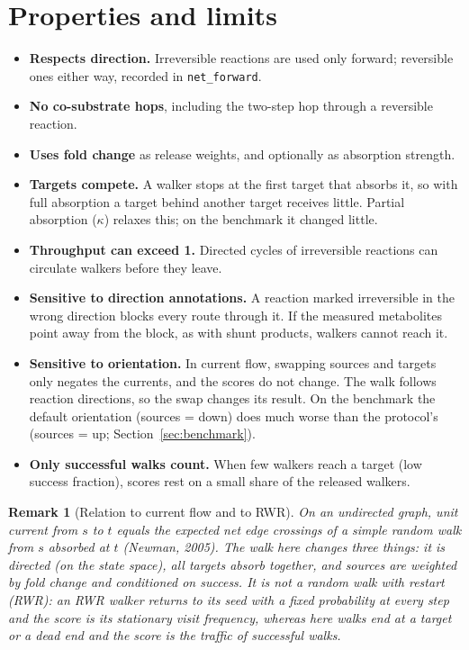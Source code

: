 \documentclass[11pt]{article}
\newcommand{\code}[1]{\texttt{#1}}
\newtheorem*{remark}{Remark}
\begin{document}
\section{Properties and limits}
\begin{itemize}
  \item \textbf{Respects direction.} Irreversible reactions are used only forward;
        reversible ones either way, recorded in \code{net\_forward}.
  \item \textbf{No co-substrate hops}, including the two-step hop through a
        reversible reaction.
  \item \textbf{Uses fold change} as release weights, and optionally as absorption
        strength.
  \item \textbf{Targets compete.} A walker stops at the first target that absorbs
        it, so with full absorption a target behind another target receives little.
        Partial absorption ($\kappa$) relaxes this; on the benchmark it changed
        little.
  \item \textbf{Throughput can exceed 1.} Directed cycles of irreversible reactions
        can circulate walkers before they leave.
  \item \textbf{Sensitive to direction annotations.} A reaction marked irreversible
        in the wrong direction blocks every route through it. If the measured
        metabolites point away from the block, as with shunt products, walkers cannot
        reach it.
  \item \textbf{Sensitive to orientation.} In current flow, swapping sources and
        targets only negates the currents, and the scores do not change. The walk
        follows reaction directions, so the swap changes its result. On the benchmark
        the default orientation (sources = down) does much worse than the
        protocol's (sources = up; Section~\ref{sec:benchmark}).
  \item \textbf{Only successful walks count.} When few walkers reach a target (low
        success fraction), scores rest on a small share of the released walkers.
\end{itemize}

\begin{remark}[Relation to current flow and to RWR]
On an undirected graph, unit current from $s$ to $t$ equals the expected net edge
crossings of a simple random walk from $s$ absorbed at $t$ (Newman, 2005). The walk
here changes three things: it is directed (on the state space), all targets absorb
together, and sources are weighted by fold change and conditioned on success. It is
not a random walk with restart (RWR): an RWR walker returns to its seed with a fixed
probability at every step and the score is its stationary visit frequency, whereas
here walks end at a target or a dead end and the score is the traffic of successful
walks.
\end{remark}
\end{document}
